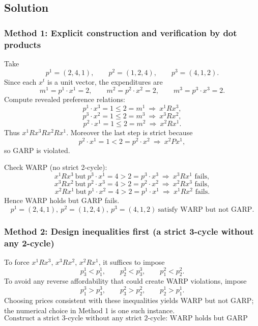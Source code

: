 \documentclass[12pt]{article}
\newcommand{\dotp}{\cdot}
\begin{document}
\subsection*{Solution}
\subsubsection*{Method 1: Explicit construction and verification by dot products}
Take
\[
p^{1}=(2,4,1),\qquad p^{2}=(1,2,4),\qquad p^{3}=(4,1,2).
\]
Since each \(x^{t}\) is a unit vector, the expenditures are
\[
m^{1}=p^{1}\dotp x^{1}=2,\qquad m^{2}=p^{2}\dotp x^{2}=2,\qquad m^{3}=p^{3}\dotp x^{3}=2.
\]
Compute revealed preference relations:
\[
p^{1}\dotp x^{3}=1\le 2=m^{1}\ \Rightarrow\ x^{1}R x^{3},
\]
\[
p^{3}\dotp x^{2}=1\le 2=m^{3}\ \Rightarrow\ x^{3}R x^{2},
\]
\[
p^{2}\dotp x^{1}=1\le 2=m^{2}\ \Rightarrow\ x^{2}R x^{1}.
\]
Thus \(x^{1}R x^{3}R x^{2}R x^{1}\). Moreover the last step is strict because
\[
p^{2}\dotp x^{1}=1<2=p^{2}\dotp x^{2}\ \Rightarrow\ x^{2}P x^{1},
\]
so GARP is violated.

Check WARP (no strict 2-cycle):
\[
x^{1}R x^{3}\ \text{but}\ p^{3}\dotp x^{1}=4>2=p^{3}\dotp x^{3}\ \Rightarrow\ x^{3}R x^{1}\text{ fails},
\]
\[
x^{3}R x^{2}\ \text{but}\ p^{2}\dotp x^{3}=4>2=p^{2}\dotp x^{2}\ \Rightarrow\ x^{2}R x^{3}\text{ fails},
\]
\[
x^{2}R x^{1}\ \text{but}\ p^{1}\dotp x^{2}=4>2=p^{1}\dotp x^{1}\ \Rightarrow\ x^{1}R x^{2}\text{ fails}.
\]
Hence WARP holds but GARP fails.
\[
\boxed{p^{1}=(2,4,1),\ p^{2}=(1,2,4),\ p^{3}=(4,1,2)\ \text{satisfy WARP but not GARP.}}
\]

\subsubsection*{Method 2: Design inequalities first (a strict 3-cycle without any 2-cycle)}
To force \(x^{1}R x^{3}\), \(x^{3}R x^{2}\), \(x^{2}R x^{1}\), it suffices to impose
\[
p_3^{1}<p_1^{1},\qquad p_2^{3}<p_3^{3},\qquad p_1^{2}<p_2^{2}.
\]
To avoid any reverse affordability that could create WARP violations, impose
\[
p_1^{3}>p_3^{3},\qquad p_3^{2}>p_2^{2},\qquad p_2^{1}>p_1^{1}.
\]
Choosing prices consistent with these inequalities yields WARP but not GARP; the numerical choice in Method 1 is one such instance.
\[
\boxed{\text{Construct a strict 3-cycle without any strict 2-cycle: WARP holds but GARP fails.}}
\]
\end{document}

